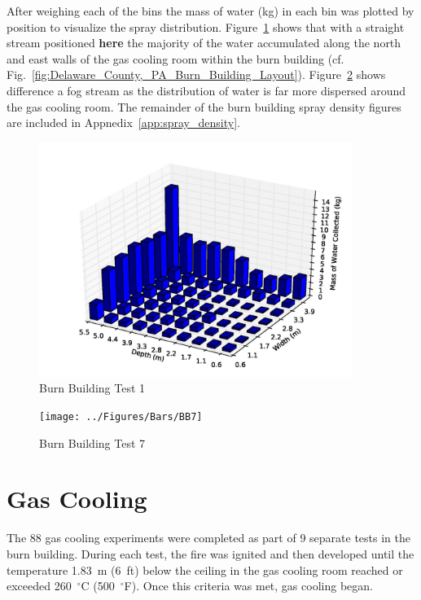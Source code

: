 \documentclass[12pt,oneside]{book}
\begin{document}
\clearpage

After weighing each of the bins the mass of water (kg) in each bin was plotted by position to visualize the spray distribution. Figure~\ref{fig:Burn_Building_Test_1} shows that with a straight stream positioned {\bf here} the majority of the water accumulated along the north and east walls of the gas cooling room within the burn building (cf. Fig.~\ref{fig:Delaware_County,_PA_Burn_Building_Layout}). Figure~\ref{fig:Burn_Building_Test_7} shows difference a fog stream as the distribution of water is far more dispersed around the gas cooling room. The remainder of the burn building spray density figures are included in Appnedix~\ref{app:spray_density}.

\begin{figure}[!ht]
	\includegraphics[width=4in]{../Figures/Bars/BB1}
	\caption{Burn Building Test 1}
	\label{fig:Burn_Building_Test_1}
\end{figure}

\begin{figure}[!ht]
	\texttt{[image: ../Figures/Bars/BB7]}
	\caption{Burn Building Test 7}
	\label{fig:Burn_Building_Test_7}
\end{figure}


\clearpage

\section{Gas Cooling}
\label{sec:Gas_Cooling}

The 88 gas cooling experiments were completed as part of 9 separate tests in the burn building. During each test, the fire was ignited and then developed until the temperature 1.83~m (6~ft) below the ceiling in the gas cooling room reached or exceeded 260~$^{\circ}$C (500~$^{\circ}$F). Once this criteria was met, gas cooling began. 
\end{document}
